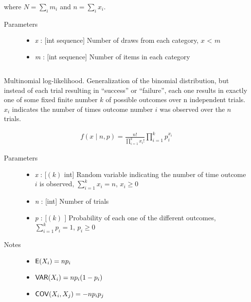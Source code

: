 \documentclass[]{jss}
\begin{document}
where $N = \sum_i m_i$ and $n = \sum_i x_i$.
\begin{description}
\item[Parameters] \leavevmode\begin{itemize}
\item {} 
\emph{x} : {[}int sequence{]} Number of draws from each category, $x$ \textless{} $m$

\item {} 
\emph{m} : {[}int sequence{]} Number of items in each category

\end{itemize}

\end{description}

\subsection[multinomial]{ }

Multinomial log-likelihood. Generalization of the binomial
distribution, but instead of each trial resulting in ``success'' or
``failure'', each one results in exactly one of some fixed finite number $k$
of possible outcomes over n independent trials. $x_i$ indicates the number
of times outcome number $i$ was observed over the $n$ trials.

\begin{eqnarray*}
f(x \mid n, p) = \frac{n!}{\prod_{i=1}^k x_i!} \prod_{i=1}^k p_i^{x_i}    
\end{eqnarray*}
    
\begin{description}
\item[Parameters] \leavevmode\begin{itemize}
\item{} 

\emph{x} : {[}$(k)$ int{]} Random variable indicating the number of time outcome $i$ is 
observed, $\sum_{i=1}^k x_i=n$, $x_i \ge 0$

\item{} 
\emph{n} : {[}int{]}
Number of trials

\item {}
\emph{p} : {[}$(k)$ {]} Probability of each one of the different outcomes,
$\sum_{i=1}^k p_i = 1$, $p_i \ge 0$



\end{itemize}

\item[Notes]\leavevmode\begin{itemize}
\item {} 
$\mathsf{E}(X_i)=n p_i$

\item {} 
$\mathsf{VAR}(X_i)=n p_i(1-p_i)$

\item {} 
$\mathsf{COV}(X_i,X_j) = -n p_i p_j$

\end{itemize}

\end{description}
\end{document}
